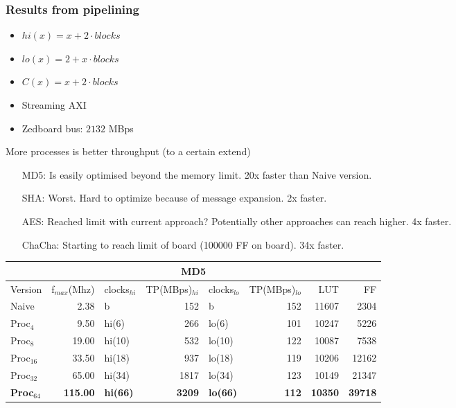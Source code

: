\begin{frame}
  \frametitle{Results from pipelining}
  \fontsize{4pt}{6}\selectfont
\begin{minipage}[b]{0.3\textwidth}
  \begin{tiny}
  \begin{itemize}
  \item $hi(x) = x+2 \cdot blocks$
  \item $lo(x) = 2 + x \cdot blocks$
  \item $C(x) = x + 2 \cdot blocks$
  \item Streaming AXI
    \item Zedboard bus: $2132$ MBps
  \end{itemize}
  More processes is better throughput (to a certain extend)
  \begin{itemize}
    \item[MD5:] Is easily optimised beyond the memory limit. 20x faster than Naive version.
    \item[SHA:] Worst. Hard to optimize because of message expansion. 2x faster.
    \item[AES:] Reached limit with current approach? Potentially other approaches can reach higher. 4x faster.
    \item[ChaCha:] Starting to reach limit of board (100000 FF on board). 34x faster.
  \end{itemize}
  \end{tiny}
\end{minipage}
\qquad
\begin{minipage}[b]{0.65\textwidth}
\begin{tabular}{l r l r l r r r}
\multicolumn{8}{c}{MD5}\\
\hline
Version & f$_{max}$(Mhz) & clocks$_{hi}$ & TP(MBps)$_{hi}$ &clocks$_{lo}$ & TP(MBps)$_{lo}$ & LUT & FF\\
\hline
Naive     & 2.38   & b      &   152& b     &  152 & 11607 & 2304\\
Proc$_{4}$ & 9.50   & hi(6)  &  266& lo(6) & 101 & 10247 & 5226\\
Proc$_{8}$ & 19.00  & hi(10) &  532& lo(10)& 122 & 10087 & 7538\\
Proc$_{16}$ & 33.50  & hi(18) & 937& lo(18)&119 & 10206 & 12162\\
Proc$_{32}$ & 65.00  & hi(34) & 1817& lo(34)&123 & 10149 & 21347\\
\textbf{Proc}$_{64}$ & \textbf{115.00} & \textbf{hi(66)} & \textbf{3209}& \textbf{lo(66)} &\textbf{112} & \textbf{10350} & \textbf{39718}\\

\end{tabular}
\end{minipage}
\end{frame}
